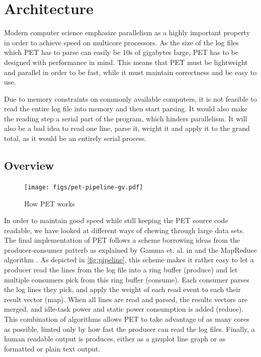 \section{Architecture}

Modern computer science emphasize parallelism as a highly important property in
order to achieve speed on multicore processors. As the size of the log files
which PET has to parse can easily be 10s of gigabytes large, PET has to be
designed with performance in mind. This means that PET must be lightweight and parallel
in order to be fast, while it must maintain correctness and be easy to use.

Due to memory constraints on commonly available computers, it is not feasible to read the entire log
file into memory and then start parsing. It would also make the reading step a serial part of the program,
which hinders parallelism. It will also be a bad idea to read one line, parse
it, weight it and apply it to the grand total, as it would be an entirely serial process.

\subsection{Overview}

\begin{figure}[ht]
    \texttt{[image: figs/pet-pipeline-gv.pdf]}
    \caption{How PET works}
    \label{fig:pipeline}
\end{figure}

In order to maintain good speed while still keeping the PET source code
readable, we have looked at different ways of chewing through large data sets.
The final implementation of PET follows a scheme borrowing ideas from the
producer-consumer patterb as explained by Gamma et. al. in \cite{designpatterns}
and the MapReduce algorithm \cite{dean2008mapreduce}.  As depicted in
\autoref{fig:pipeline}, this scheme makes it rather easy to let a producer read
the lines from the log file into a ring buffer (produce) and let multiple
consumers pick from this ring buffer (consume). Each consumer parses the log
lines they pick, and apply the weight of each read event to each their result
vector (map). When all lines are read and parsed, the results vectors are
merged, and idle-task power and static power consumption is added (reduce). This
combination of algorithms allows PET to take advantage of as many cores as
possible, limted only by how fast the producer can read the log files. Finally,
a human readable output is produces, either as a gnuplot line graph or as
formatted or plain text output.

